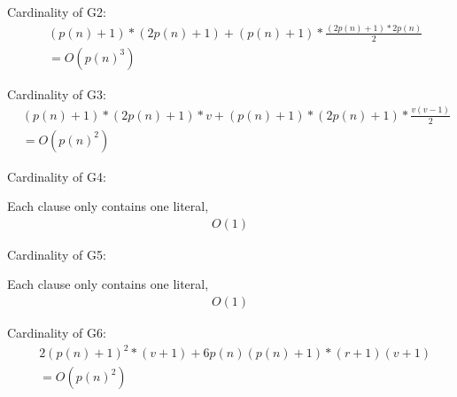 \documentclass[12pt,a4paper]{report}
\begin{document}
Cardinality of G2: 
\begin{equation*}
\begin{split}
& (p(n)+1) * (2p(n)+1) + (p(n)+1) * \frac {(2p(n)+1)*2p(n)}{2} \\
&= O(p(n)^{3})
\end{split}
\end{equation*}

Cardinality of G3: 
\begin{equation*}
\begin{split}
& (p(n)+1) * (2p(n)+1) * v + (p(n)+1) * (2p(n)+1) * \frac {v(v-1)}{2} \\
&= O(p(n)^{2})
\end{split}
\end{equation*}

Cardinality of G4:

Each clause only contains one literal,
\begin{equation*}
\begin{split}
O(1)
\end{split}
\end{equation*}

Cardinality of G5:

Each clause only contains one literal,
\begin{equation*}
\begin{split}
O(1)
\end{split}
\end{equation*}

Cardinality of G6:
\begin{equation*}
\begin{split}
& 2(p(n)+1)^{2} * (v+1) + 6p(n)(p(n)+1)*(r+1)(v+1) \\
& = O(p(n)^{2})
\end{split}
\end{equation*}
\end{document}
